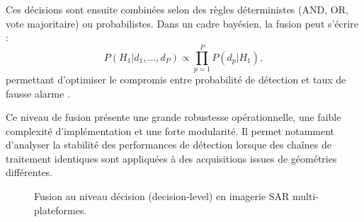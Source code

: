 Ces décisions sont ensuite combinées selon des règles déterministes (AND, OR, vote majoritaire) ou probabilistes.  
Dans un cadre bayésien, la fusion peut s’écrire :
\begin{equation}
P(H_1 | d_1,\dots,d_P) \propto \prod_{p=1}^{P} P(d_p | H_1),
\end{equation}
permettant d’optimiser le compromis entre probabilité de détection et taux de fausse alarme \cite{chair1996,varshney1997}.

Ce niveau de fusion présente une grande robustesse opérationnelle, une faible complexité d’implémentation et une forte modularité.  
Il permet notamment d’analyser la stabilité des performances de détection lorsque des chaînes de traitement identiques sont appliquées à des acquisitions issues de géométries différentes.

\begin{figure}[H]
\centering
{}
\caption{Fusion au niveau décision (decision-level) en imagerie SAR multi-plateformes.}
\label{fig:decision_level_fusion}
\end{figure}


